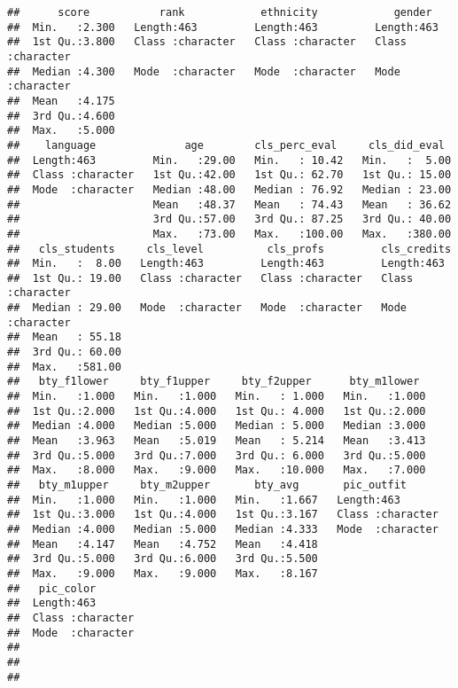 \documentclass[
]{article}
\begin{document}
\begin{verbatim}
##      score           rank            ethnicity            gender         
##  Min.   :2.300   Length:463         Length:463         Length:463        
##  1st Qu.:3.800   Class :character   Class :character   Class :character  
##  Median :4.300   Mode  :character   Mode  :character   Mode  :character  
##  Mean   :4.175                                                           
##  3rd Qu.:4.600                                                           
##  Max.   :5.000                                                           
##    language              age        cls_perc_eval     cls_did_eval   
##  Length:463         Min.   :29.00   Min.   : 10.42   Min.   :  5.00  
##  Class :character   1st Qu.:42.00   1st Qu.: 62.70   1st Qu.: 15.00  
##  Mode  :character   Median :48.00   Median : 76.92   Median : 23.00  
##                     Mean   :48.37   Mean   : 74.43   Mean   : 36.62  
##                     3rd Qu.:57.00   3rd Qu.: 87.25   3rd Qu.: 40.00  
##                     Max.   :73.00   Max.   :100.00   Max.   :380.00  
##   cls_students     cls_level          cls_profs         cls_credits       
##  Min.   :  8.00   Length:463         Length:463         Length:463        
##  1st Qu.: 19.00   Class :character   Class :character   Class :character  
##  Median : 29.00   Mode  :character   Mode  :character   Mode  :character  
##  Mean   : 55.18                                                           
##  3rd Qu.: 60.00                                                           
##  Max.   :581.00                                                           
##   bty_f1lower     bty_f1upper     bty_f2upper      bty_m1lower   
##  Min.   :1.000   Min.   :1.000   Min.   : 1.000   Min.   :1.000  
##  1st Qu.:2.000   1st Qu.:4.000   1st Qu.: 4.000   1st Qu.:2.000  
##  Median :4.000   Median :5.000   Median : 5.000   Median :3.000  
##  Mean   :3.963   Mean   :5.019   Mean   : 5.214   Mean   :3.413  
##  3rd Qu.:5.000   3rd Qu.:7.000   3rd Qu.: 6.000   3rd Qu.:5.000  
##  Max.   :8.000   Max.   :9.000   Max.   :10.000   Max.   :7.000  
##   bty_m1upper     bty_m2upper       bty_avg       pic_outfit       
##  Min.   :1.000   Min.   :1.000   Min.   :1.667   Length:463        
##  1st Qu.:3.000   1st Qu.:4.000   1st Qu.:3.167   Class :character  
##  Median :4.000   Median :5.000   Median :4.333   Mode  :character  
##  Mean   :4.147   Mean   :4.752   Mean   :4.418                     
##  3rd Qu.:5.000   3rd Qu.:6.000   3rd Qu.:5.500                     
##  Max.   :9.000   Max.   :9.000   Max.   :8.167                     
##   pic_color        
##  Length:463        
##  Class :character  
##  Mode  :character  
##                    
##                    
## 
\end{verbatim}
\end{document}
